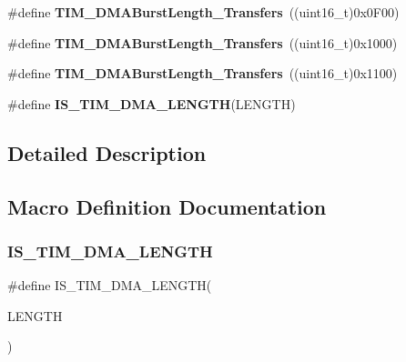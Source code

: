 \begin{DoxyCompactItemize}
\#define {\bfseries T\+I\+M\+\_\+\+D\+M\+A\+Burst\+Length\+\_\+Transfers}~((uint16\+\_\+t)0x0\+F00)
\item 
\mbox{\label{group___t_i_m___d_m_a___burst___length_ga5b2c97f650a3c1726965187d852b8cc5}} 
\#define {\bfseries T\+I\+M\+\_\+\+D\+M\+A\+Burst\+Length\+\_\+Transfers}~((uint16\+\_\+t)0x1000)
\item 
\mbox{\label{group___t_i_m___d_m_a___burst___length_gaed9f2afef174079f6eb6927abd995b9b}} 
\#define {\bfseries T\+I\+M\+\_\+\+D\+M\+A\+Burst\+Length\+\_\+Transfers}~((uint16\+\_\+t)0x1100)
\item 
\#define {\bfseries I\+S\+\_\+\+T\+I\+M\+\_\+\+D\+M\+A\+\_\+\+L\+E\+N\+G\+TH}(L\+E\+N\+G\+TH)
\end{DoxyCompactItemize}


\subsection{Detailed Description}


\subsection{Macro Definition Documentation}
\mbox{\label{group___t_i_m___d_m_a___burst___length_gafd09cf0887b01a15101ba7dd6e2b4ba7}} 
\subsubsection{\texorpdfstring{I\+S\+\_\+\+T\+I\+M\+\_\+\+D\+M\+A\+\_\+\+L\+E\+N\+G\+TH}{IS\_TIM\_DMA\_LENGTH}}
{\footnotesize\ttfamily \#define I\+S\+\_\+\+T\+I\+M\+\_\+\+D\+M\+A\+\_\+\+L\+E\+N\+G\+TH(\begin{DoxyParamCaption}\item[{}]{L\+E\+N\+G\+TH }\end{DoxyParamCaption})}

